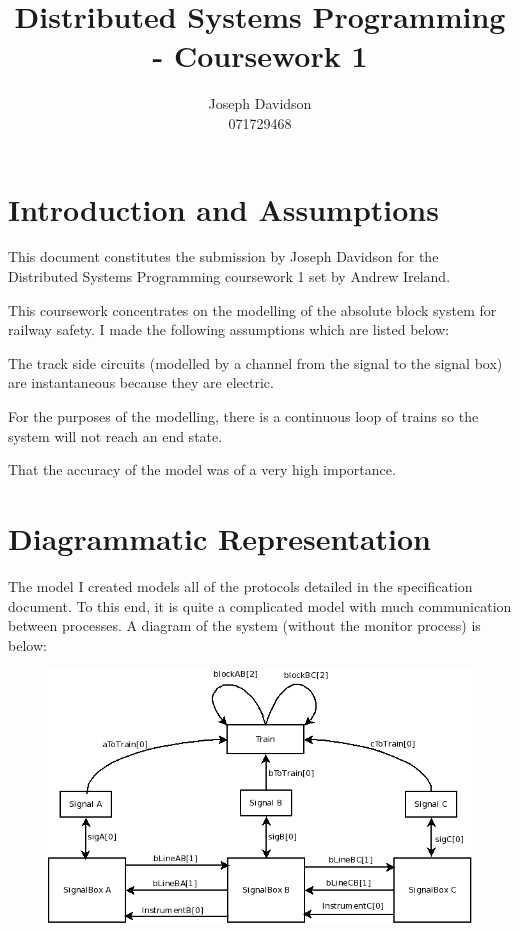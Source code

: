 \documentclass[10pt]{article}
\title{Distributed Systems Programming - Coursework 1}
\author{Joseph Davidson \\  071729468}
\date{}
\begin{document}
  \maketitle

  \section{Introduction and Assumptions}
    This document constitutes the submission by Joseph Davidson for
    the Distributed Systems Programming coursework 1 set by Andrew Ireland.
    
    This coursework concentrates on the modelling of the absolute block
    system for railway safety. I made the following assumptions which are
    listed below:
    \begin{itemize*}
      \item The track side circuits (modelled by a channel from the signal
            to the signal box) are instantaneous because they are electric.
      \item For the purposes of the modelling, there is a continuous loop of
            trains so the system will not reach an end state.
      \item That the accuracy of the model was of a very high importance.
    \end{itemize*}
    
   
  \section{Diagrammatic Representation}
    The model I created models all of the protocols detailed in the
    specification document. To this end, it is quite a complicated model
    with much communication between processes. A diagram of the system 
    (without the monitor process) is below:
    \begin{figure}[H]
      \includegraphics[scale=0.6]{diagram.png}
    \end{figure}
\end{document}
